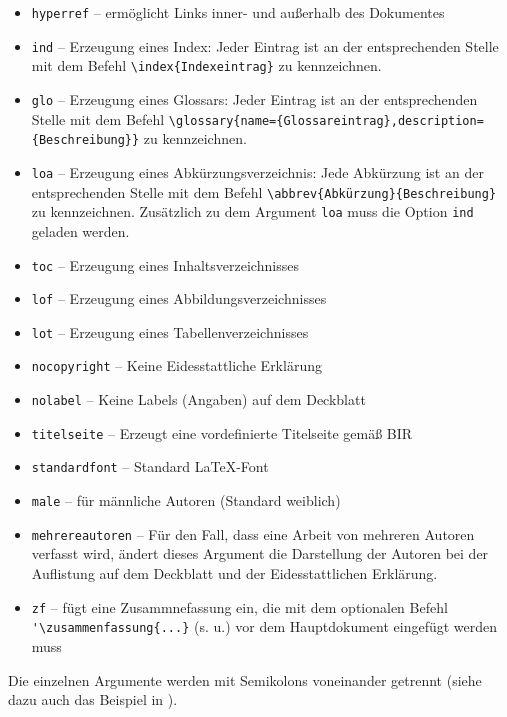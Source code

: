 \begin{itemize}
  \item{\verb"hyperref"} -- ermöglicht Links inner- und außerhalb des Dokumentes

  \item{\verb"ind"} -- Erzeugung eines Index: Jeder Eintrag ist an der entsprechenden Stelle mit dem Befehl
      \verb"\index{Indexeintrag}" zu kennzeichnen.

  \item{\verb"glo"} -- Erzeugung eines Glossars: Jeder Eintrag ist an der entsprechenden Stelle mit dem Befehl
      \verb"\glossary{name={Glossareintrag},description={Beschreibung}}" zu kennzeichnen.

  \item{\verb"loa"} -- Erzeugung eines Abkürzungsverzeichnis: Jede Abkürzung ist an der entsprechenden Stelle mit
      dem Befehl \verb"\abbrev{Abkürzung}{Beschreibung}" zu kennzeichnen. Zusätzlich zu dem Argument \verb"loa" muss die Option \verb"ind" geladen werden.

   \item{\verb"toc"} -- Erzeugung eines Inhaltsverzeichnisses

   \item{\verb"lof"} -- Erzeugung eines Abbildungsverzeichnisses

   \item{\verb"lot"} -- Erzeugung eines Tabellenverzeichnisses

   \item{\verb"nocopyright"} -- Keine Eidesstattliche Erklärung

   \item{\verb"nolabel"} -- Keine Labels (Angaben) auf dem Deckblatt

   \item{\verb"titelseite"} -- Erzeugt eine vordefinierte Titelseite gemäß BIR

   \item{\verb"standardfont"} -- Standard \LaTeX-Font

   \item{\verb"male"} -- für männliche Autoren (Standard weiblich)

   \item{\verb"mehrereautoren"} -- Für den Fall, dass eine Arbeit von mehreren Autoren verfasst wird, ändert dieses
       Argument die Darstellung der Autoren bei der Auflistung auf dem Deckblatt und der Eidesstattlichen
       Erklärung.
	 
	 \item{\verb"zf"} -- fügt eine Zusammnefassung ein, die mit dem optionalen Befehl \verb"'\zusammenfassung{...}" (s. u.) vor dem Hauptdokument eingefügt werden muss
       
\end{itemize}
Die einzelnen Argumente werden mit Semikolons voneinander getrennt (siehe dazu auch das Beispiel in
).

